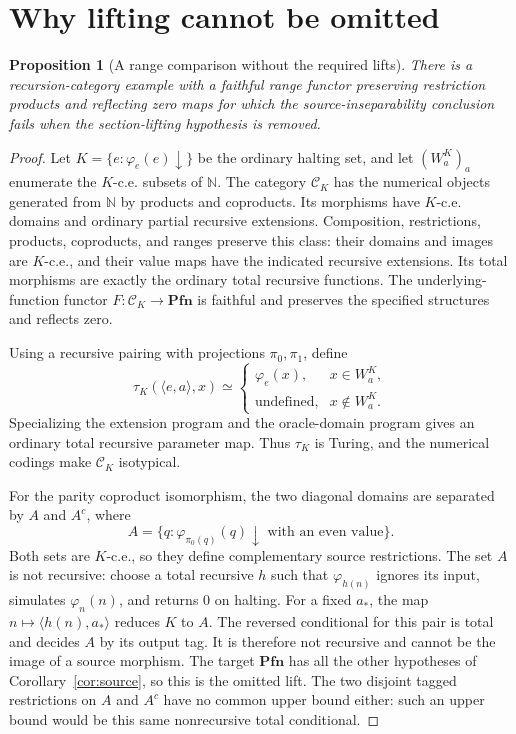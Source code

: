 \documentclass[11pt]{article}
\newtheorem{proposition}[theorem]{Proposition}
\theoremstyle{definition}\newtheorem{definition}[theorem]{Definition}
\newcommand{\N}{\mathbb N}
\newcommand{\Pfn}{\mathbf{Pfn}}
\begin{document}
\section{Why lifting cannot be omitted}
\begin{proposition}[A range comparison without the required lifts]
There is a recursion-category example with a faithful range functor
preserving restriction products and reflecting zero maps for which
the source-inseparability conclusion fails when the section-lifting
hypothesis is removed.
\end{proposition}
\begin{proof}
Let $K=\{e:\varphi_e(e)\downarrow\}$ be the ordinary halting set,
and let $(W_a^K)_a$ enumerate the $K$-c.e. subsets of $\N$.
The category $\mathcal C_K$ has the numerical objects generated
from $\N$ by products and coproducts. Its morphisms have $K$-c.e.
domains and ordinary partial recursive extensions. Composition,
restrictions, products, coproducts, and ranges preserve this class:
their domains and images are $K$-c.e., and their value maps have
the indicated recursive extensions. Its total morphisms are exactly
the ordinary total recursive functions. The underlying-function
functor $F:\mathcal C_K\to\Pfn$ is faithful and preserves the
specified structures and reflects zero.

Using a recursive pairing with projections $\pi_0,\pi_1$, define
\[
 \tau_K(\langle e,a\rangle,x)\simeq
 \begin{cases}
 \varphi_e(x),&x\in W_a^K,\\
 \text{undefined},&x\notin W_a^K.
 \end{cases}
\]
Specializing the extension program and the oracle-domain program
gives an ordinary total recursive parameter map. Thus $\tau_K$
is Turing, and the numerical codings make $\mathcal C_K$ isotypical.

For the parity coproduct isomorphism, the two diagonal domains
are separated by $A$ and $A^c$, where
\[
 A=\{q:\varphi_{\pi_0(q)}(q)\downarrow
                          \text{ with an even value}\}.
\]
Both sets are $K$-c.e., so they define complementary source
restrictions. The set $A$ is not recursive: choose a total recursive
$h$ such that $\varphi_{h(n)}$ ignores its input, simulates
$\varphi_n(n)$, and returns $0$ on halting. For a fixed $a_*$,
the map $n\mapsto\langle h(n),a_*\rangle$ reduces $K$ to $A$.
The reversed conditional
for this pair is total and decides $A$ by its output tag. It is
therefore not recursive and cannot be the image of a source morphism.
The target $\Pfn$ has all the other hypotheses of
Corollary~\ref{cor:source}, so this is the omitted lift.
The two disjoint tagged restrictions on $A$ and $A^c$ have no
common upper bound either: such an upper bound would be this same
nonrecursive total conditional.
\end{proof}
\end{document}
